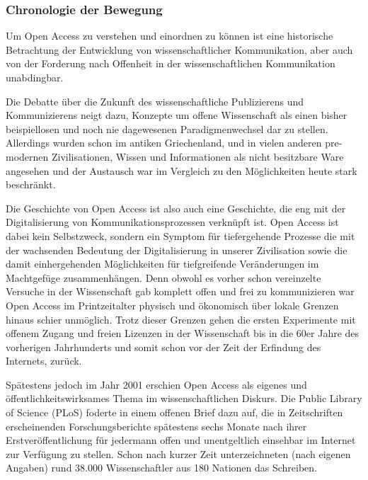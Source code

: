 \subsubsection{Chronologie der Bewegung}
Um Open Access zu verstehen und einordnen zu können ist eine historische Betrachtung der Entwicklung von wissenschaftlicher Kommunikation, aber auch von der Forderung nach Offenheit in der wissenschaftlichen Kommunikation unabdingbar. 

Die Debatte über die Zukunft des wissenschaftliche Publizierens und Kommunizierens neigt dazu, Konzepte um offene Wissenschaft als einen bisher beispiellosen und noch nie dagewesenen Paradigmenwechsel dar zu stellen\cite{cite:17a}\cite{cite:17b}\cite{cite:17c}. Allerdings wurden schon im antiken Griechenland, und in vielen anderen pre-modernen Zivilisationen, Wissen und Informationen als nicht besitzbare Ware angesehen\cite{cite:18} und der Austausch war im Vergleich zu den Möglichkeiten heute stark beschränkt.

Die Geschichte von Open Access ist also auch eine Geschichte, die eng mit der Digitalisierung von Kommunikationsprozessen verknüpft ist. Open Access ist dabei kein Selbstzweck\cite{cite:17d}, sondern ein Symptom für tiefergehende Prozesse die mit der wachsenden Bedeutung der Digitalisierung in unserer Zivilisation sowie die damit einhergehenden Möglichkeiten für tiefgreifende Veränderungen im Machtgefüge zusammenhängen\cite{cite:17e}. Denn obwohl es vorher schon vereinzelte Versuche in der Wissenschaft gab komplett offen und frei zu kommunizieren war Open Access im Printzeitalter physisch und ökonomisch über lokale Grenzen hinaus schier unmöglich\cite{cite:18a}. Trotz dieser Grenzen gehen die ersten Experimente mit offenem Zugang und freien Lizenzen in der Wissenschaft bis in die 60er Jahre des vorherigen Jahrhunderts und somit schon vor der Zeit der Erfindung des Internets, zurück.

Spätestens jedoch im Jahr 2001 erschien Open Access als eigenes und öffentlichkeitswirksames Thema im wissenschaftlichen Diskurs\cite{cite:19}. Die Public Library of Science (PLoS) foderte in einem offenen Brief\cite{cite:20} dazu auf, die in Zeitschriften erscheinenden Forschungsberichte spätestens sechs Monate nach ihrer Erstveröffentlichung für jedermann offen und unentgeltlich einsehbar im Internet zur Verfügung zu stellen. Schon nach kurzer Zeit unterzeichneten (nach eigenen Angaben\cite{cite:19a}) rund 38.000 Wissenschaftler aus 180 Nationen das Schreiben.

